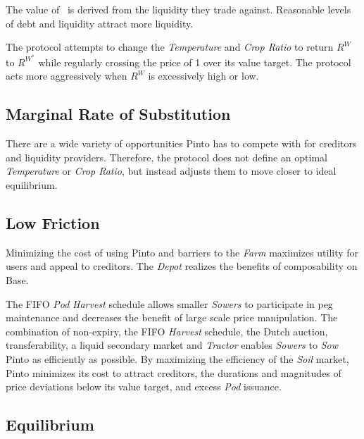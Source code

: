 \documentclass[tikz]{article}
\newcommand{\term}[1]{\textsl{#1}}
\newcommand{\Pinto}{} %
\begin{document}
The value of \Pinto\ is derived from the liquidity they trade against. Reasonable levels of debt and liquidity attract more liquidity. 

The protocol attempts to change the \term{Temperature} and \term{Crop Ratio} to return $R^{W}$ to $R^{W^{*}}$ while regularly crossing the price of \Pinto1 over its value target. The protocol acts more aggressively when $R^{W}$ is excessively high or low.


\subsection{Marginal Rate of Substitution}

There are a wide variety of opportunities Pinto has to compete with for creditors and liquidity providers. Therefore, the protocol does not define an optimal \term{Temperature} or \term{Crop Ratio}, but instead adjusts them to move closer to ideal equilibrium. 


\subsection{Low Friction}

Minimizing the cost of using Pinto and barriers to the \term{Farm} maximizes utility for users and appeal to creditors. The \term{Depot} realizes the benefits of composability on Base.

The FIFO \term{Pod} \term{Harvest} schedule allows smaller \term{Sowers} to participate in peg maintenance and decreases the benefit of large scale price manipulation. The combination of non-expiry, the FIFO \term{Harvest} schedule, the Dutch auction, transferability, a liquid secondary market and \term{Tractor} enables \term{Sowers} to \term{Sow} Pinto as efficiently as possible. By maximizing the efficiency of the \term{Soil} market, Pinto minimizes its cost to attract creditors, the durations and magnitudes of price deviations below its value target, and excess \term{Pod} issuance.


\subsection{Equilibrium}
\vspace{-0.15cm}
\end{document}
